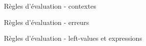 \begin{figure}

\begin{mathpar}


\end{mathpar}

    \figctx{}

\caption{Règles d'évaluation - contextes}
\end{figure}

\begin{figure}

\begin{mathpar}


\end{mathpar}

\caption{Règles d'évaluation - erreurs}
\end{figure}

\begin{figure}

\begin{mathpar}















\end{mathpar}

\caption{Règles d'évaluation - left-values et expressions }
\end{figure}

